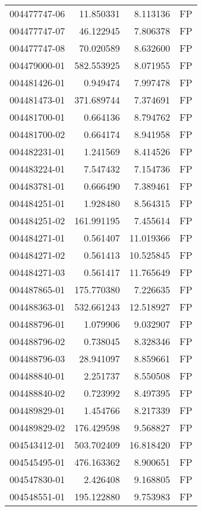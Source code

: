 \begin{tabular}{lrrl}
004477747-06 &   11.850331 &     8.113136 &   FP \\
004477747-07 &   46.122945 &     7.806378 &   FP \\
004477747-08 &   70.020589 &     8.632600 &   FP \\
004479000-01 &  582.553925 &     8.071955 &   FP \\
004481426-01 &    0.949474 &     7.997478 &   FP \\
004481473-01 &  371.689744 &     7.374691 &   FP \\
004481700-01 &    0.664136 &     8.794762 &   FP \\
004481700-02 &    0.664174 &     8.941958 &   FP \\
004482231-01 &    1.241569 &     8.414526 &   FP \\
004483224-01 &    7.547432 &     7.154736 &   FP \\
004483781-01 &    0.666490 &     7.389461 &   FP \\
004484251-01 &    1.928480 &     8.564315 &   FP \\
004484251-02 &  161.991195 &     7.455614 &   FP \\
004484271-01 &    0.561407 &    11.019366 &   FP \\
004484271-02 &    0.561413 &    10.525845 &   FP \\
004484271-03 &    0.561417 &    11.765649 &   FP \\
004487865-01 &  175.770380 &     7.226635 &   FP \\
004488363-01 &  532.661243 &    12.518927 &   FP \\
004488796-01 &    1.079906 &     9.032907 &   FP \\
004488796-02 &    0.738045 &     8.328346 &   FP \\
004488796-03 &   28.941097 &     8.859661 &   FP \\
004488840-01 &    2.251737 &     8.550508 &   FP \\
004488840-02 &    0.723992 &     8.497395 &   FP \\
004489829-01 &    1.454766 &     8.217339 &   FP \\
004489829-02 &  176.429598 &     9.568827 &   FP \\
004543412-01 &  503.702409 &    16.818420 &   FP \\
004545495-01 &  476.163362 &     8.900651 &   FP \\
004547830-01 &    2.426408 &     9.168805 &   FP \\
004548551-01 &  195.122880 &     9.753983 &   FP \\

\end{tabular}
